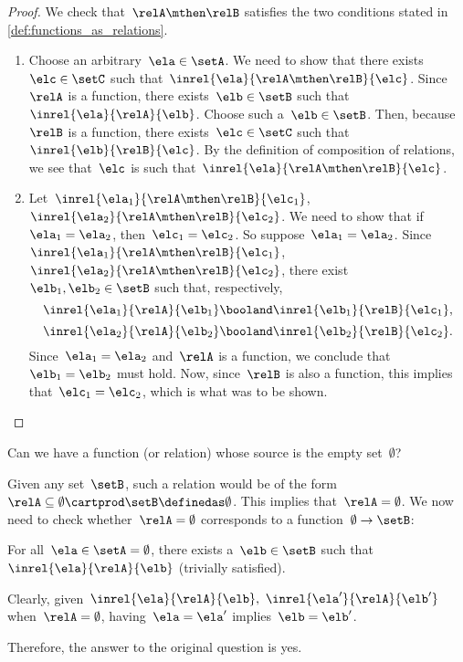 \begin{proof}
    We check that~$\relA \mthen \relB$ satisfies the two conditions stated in \cref{def:functions_as_relations}.

    \begin{enumerate}
        \item Choose an arbitrary~$\ela \in \setA$.
        We need to show that there exists~$\elc \in \setC$ such that~$\inrel{\ela}{\relA \mthen \relB}{\elc}$.
        Since~$\relA$ is a function, there exists~$\elb \in \setB$ such that~$\inrel{\ela}{\relA}{\elb}$.
        Choose such a~$\elb \in \setB$.
        Then, because~$\relB$ is a function, there exists~$\elc \in \setC$ such that~$\inrel{\elb}{\relB}{\elc}$.
        By the definition of composition of relations, we see that~$\elc$ is such that~$\inrel{\ela}{\relA \mthen \relB}{\elc}$.
        \item Let~$\inrel{\ela_1}{\relA \mthen \relB}{\elc_1}$,~$\inrel{\ela_2}{\relA \mthen \relB}{\elc_2}$.
        We need to show that if~$\ela_1 = \ela_2$, then~$\elc_1 = \elc_2$.
        So suppose~$\ela_1 = \ela_2$.
        Since~$\inrel{\ela_1}{\relA \mthen \relB}{\elc_1}$,~$\inrel{\ela_2}{\relA \mthen \relB}{\elc_2}$, there exist~$\elb_1, \elb_2 \in \setB$ such that, respectively,
        \begin{equation*}
            \inrel{\ela_1}{\relA}{\elb_1} \booland \inrel{\elb_1}{\relB}{\elc_1},
        \end{equation*}
        \begin{equation*}
            \inrel{\ela_2}{\relA}{\elb_2} \booland \inrel{\elb_2}{\relB}{\elc_2}.
        \end{equation*}
        Since~$\ela_1 = \ela_2$ and~$\relA$ is a function, we conclude that~$\elb_1 = \elb_2$ must hold.
        Now, since~$\relB$ is also a function, this implies that~$\elc_1 = \elc_2$, which is what was to be shown.
    \end{enumerate}
\end{proof}

\begin{exercise}
    Can we have a function (or relation) whose source is the empty set~$\emptyset$?
\end{exercise}
\begin{solution}
    Given any set~$\setB$, such a relation would be of the form~$\relA \subseteq \emptyset \cartprod \setB \definedas \emptyset$.
    This implies that~$\relA=\emptyset$.
    We now need to check whether~$\relA=\emptyset$ corresponds to a function~$\emptyset\to \setB$:
    \begin{compactitem}
        \item For all~$\ela\in \setA=\emptyset$, there exists a~$\elb \in \setB$ such that $\inrel{\ela}{\relA}{\elb}$ (trivially satisfied).
        \item Clearly, given~$\inrel{\ela}{\relA}{\elb},~\inrel{\ela'}{\relA}{\elb'}$ when~$\relA=\emptyset$, having~$\ela=\ela'$ implies~$\elb=\elb'$.
    \end{compactitem}
    Therefore, the answer to the original question is yes.
\end{solution}

